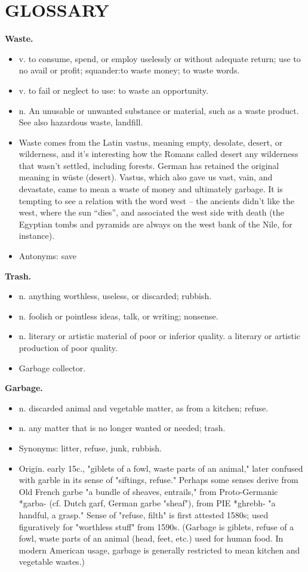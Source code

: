\section{GLOSSARY}

\noindent\textbf{Waste.}
\begin{itemize}
\item v. to consume, spend, or employ uselessly or without adequate return; use to no avail or profit; squander:to waste money; to waste words.
\item v. to fail or neglect to use: to waste an opportunity.
\item n. An unusable or unwanted substance or material, such as a waste product. See also hazardous waste, landfill. 
\item Waste comes from the Latin vastus, meaning empty, desolate, desert, or wilderness, and it’s interesting how the Romans called desert any wilderness that wasn’t settled, including forests.  German has retained the original meaning in wüste (desert). Vastus, which also gave us vast, vain, and devastate, came to mean a waste of money and ultimately garbage.  It is tempting to see a relation with the word west – the ancients didn’t like the west, where the sun “dies”, and associated the west side with death (the Egyptian tombs and pyramids are always on the west bank of the Nile, for instance)\cite{paul2013garbage}.
\item Antonyms: save
\end{itemize}

\noindent\textbf{Trash.}
\begin{itemize}
\item n. anything worthless, useless, or discarded; rubbish.
\item n. foolish or pointless ideas, talk, or writing; nonsense.
\item n. literary or artistic material of poor or inferior quality. a literary or artistic production of poor quality.
\item Garbage collector.
\end{itemize}

\noindent\textbf{Garbage.}
\begin{itemize}
\item n. discarded animal and vegetable matter, as from a kitchen; refuse.
\item n. any matter that is no longer wanted or needed; trash.
\item Synonyms: litter, refuse, junk, rubbish.
\item Origin. early 15c., "giblets of a fowl, waste parts of an animal," later confused with garble in its sense of "siftings, refuse." Perhaps some senses derive from Old French garbe "a bundle of sheaves, entrails," from Proto-Germanic *garba- (cf. Dutch garf, German garbe "sheaf"), from PIE *ghrebh- "a handful, a grasp." Sense of "refuse, filth" is first attested 1580s; used figuratively for "worthless stuff" from 1590s. (Garbage is giblets, refuse of a fowl, waste parts of an animal (head, feet, etc.) used for human food. In modern American usage, garbage is generally restricted to mean kitchen and vegetable wastes.)
\end{itemize}

